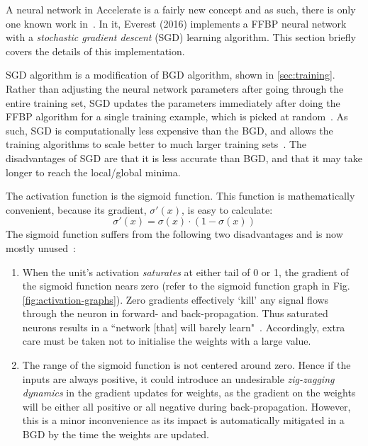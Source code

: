 A neural network in Accelerate is a fairly new concept and as such, there is only one known work in~\cite{Eve16}. In it, Everest (2016) implements a FFBP neural network with a \textit{stochastic gradient descent} (SGD) learning algorithm. This section briefly covers the details of this implementation.

SGD algorithm is a modification of BGD algorithm, shown in \ref{sec:training}. Rather than adjusting the neural network parameters after going through the entire training set, SGD updates the parameters immediately after doing the FFBP algorithm for a single training example, which is picked at random~\cite{Ng12}. As such, SGD is computationally less expensive than the BGD, and allows the training algorithms to scale better to much larger training sets~\cite{Ng12}. The disadvantages of SGD are that it is less accurate than BGD, and that it may take longer to reach the local/global minima.

The activation function is the sigmoid function. This function is mathematically convenient, because its gradient, $\sigma'(x)$, is easy to calculate:
$$\sigma'(x) = \sigma(x) \cdot (1 - \sigma(x))$$
The sigmoid function suffers from the following two disadvantages and is now mostly unused~\cite{Kar16}:
\begin{enumerate}
\item When the unit's activation \textit{saturates} at either tail of 0 or 1, the gradient of the sigmoid function nears zero (refer to the sigmoid function graph in Fig. \ref{fig:activation-graphs}). Zero gradients effectively `kill' any signal flows through the neuron in forward- and back-propagation. Thus saturated neurons results in a ``network [that] will barely learn"~\cite{Kar16}. Accordingly, extra care must be taken not to initialise the weights with a large value.
\item The range of the sigmoid function is not centered around zero. Hence if the inputs are always positive, it could introduce an undesirable \textit{zig-zagging dynamics} in the gradient updates for weights, as the gradient on the weights will be either all positive or all negative during back-propagation. However, this is a minor inconvenience as its impact is automatically mitigated in a BGD by the time the weights are updated.
\end{enumerate}

